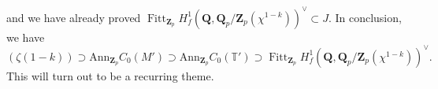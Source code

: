 \documentclass[11pt]{amsart}
\newcommand{\Q}{\mathbf{Q}}  %
\newcommand{\Z}{\mathbf{Z}}  %
\newcommand{\fitt}{\operatorname{Fitt}}
\theoremstyle{definition}
\theoremstyle{definition}
\theoremstyle{definition}
\theoremstyle{definition}
\theoremstyle{definition}
\theoremstyle{definition}
\begin{document}
and we have already proved $\fitt_{\Z_p} H^1_f(\Q, \Q_p/\Z_p(\chi^{1-k}))^\vee\subset J$.
In conclusion, we have
\begin{equation*}
    (\zeta(1-k))\supset \text{Ann}_{\Z_p}C_0(M')\supset \text{Ann}_{\Z_p}C_0(\mathbb{T}')\supset
    \fitt_{\Z_p} H^1_f(\Q, \Q_p/\Z_p(\chi^{1-k}))^\vee.
\end{equation*}
This will turn out to be a recurring theme.








\end{document}
